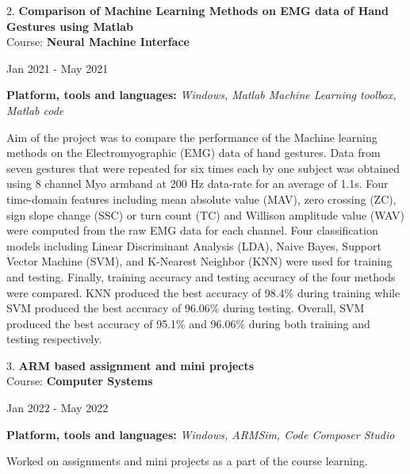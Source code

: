 \documentclass[10pt]{article}
\newenvironment{innerlist}[1][\enskip\textbullet]%
        {\begin{compactitem}[#1]}{\end{compactitem}}
\newenvironment{loneinnerlist}[1][\enskip\textbullet]%
        {\vspace{-\baselineskip}\begin{compactitem}[#1]}
        {\end{compactitem}\vspace{-.6\baselineskip}}
\begin{document}
\begin{loneinnerlist}
\item[2.]\textbf{Comparison of Machine Learning Methods on EMG data of Hand Gestures using Matlab} \\ 
\vspace{4pt}
Course: \textbf{Neural Machine Interface} \\
\vspace*{-28pt} \begin{flushright} Jan 2021 - May 2021 \end{flushright}
\textbf{Platform, tools and languages:} \emph{Windows, Matlab Machine Learning toolbox, Matlab code} 
\vspace*{2pt}
\begin{innerlist} \item Aim of the project was to compare the performance of the Machine learning methods on the Electromyographic (EMG) data of hand gestures. Data from seven gestures that were repeated for six times each by one subject was obtained using 8 channel Myo armband at 200 Hz data-rate for an average of 1.1s. Four time-domain features including mean absolute value (MAV), zero crossing (ZC), sign slope change (SSC) or turn count (TC) and Willison amplitude value (WAV) were computed from the raw EMG data for each channel. Four classification models including Linear Discriminant Analysis (LDA), Naive Bayes, Support Vector Machine (SVM), and K-Nearest Neighbor (KNN) were used for training and testing. Finally, training accuracy  and testing accuracy of the four methods were compared. KNN produced the best accuracy of 98.4\% during training while SVM produced the best accuracy of 96.06\% during testing. Overall, SVM produced the best accuracy of 95.1\% and 96.06\% during both training and testing respectively.
\end{innerlist}  \vspace*{6pt}

\item[3.]\textbf{ ARM based assignment and mini projects} \\ 
\vspace{4pt}
Course: \textbf{Computer Systems} \\
\vspace*{-28pt} \begin{flushright} Jan 2022 - May 2022 \end{flushright}
\textbf{Platform, tools and languages:} \emph{Windows, ARMSim, Code Composer Studio} 
\begin{innerlist} \item Worked on assignments and mini projects as a part of the course learning.
\end{innerlist}  \vspace*{6pt}


\end{loneinnerlist}
\end{document}
